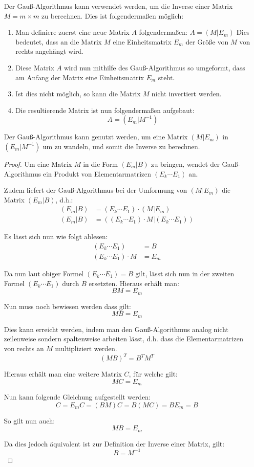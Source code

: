 Der Gauß-Algorithmus kann verwendet werden, um die Inverse einer Matrix $M = m \times m$ zu berechnen.
Dies ist folgendermaßen möglich:

\begin{enumerate}
\item Man definiere zuerst eine neue Matrix $A$ folgendermaßen:
$A = (M|E_m)$
Dies bedeutet, dass an die Matrix $M$ eine Einheitsmatrix $E_m$ der Größe von $M$ von rechts angehängt wird. 
\item Diese Matrix $A$ wird nun mithilfe des Gauß-Algorithmus so umgeformt, dass am Anfang der Matrix eine Einheitsmatrix $E_m$ steht.
\item Ist dies nicht möglich, so kann die Matrix $M$ nicht invertiert werden.
\item Die resultierende Matrix ist nun folgendermaßen aufgebaut: \[ A = (E_m|M^{-1}) \]
\end{enumerate}

\begin{Them}
Der Gauß-Algorithmus kann genutzt werden, um eine Matrix $(M|E_m)$ in $(E_m|M^{-1})$ um zu wandeln, und somit die Inverse zu berechnen.
\end{Them}

\begin{proof}
Um eine Matrix $M$ in die Form $(E_m|B)$ zu bringen, wendet der Gauß-Algorithmus ein Produkt von Elementarmatrizen $(E_k \cdots E_1)$ an.

Zudem liefert der Gauß-Algorithmus bei der Umformung von $(M|E_m)$ die Matrix $(E_m|B)$, d.h.: 
\begin{align*}
  (E_m|B) &= (E_k \cdots E_1) \cdot (M|E_m)\\ 
  (E_m|B) &= ((E_k \cdots E_1) \cdot M | (E_k \cdots E_1))
\end{align*}

Es lässt sich nun wie folgt ablesen:
\begin{align*}
 (E_k \cdots E_1) &= B \\
(E_k \cdots E_1) \cdot M &= E_m
\end{align*}

Da nun laut obiger Formel $(E_k \cdots E_1) = B$ gilt, lässt sich nun in der zweiten Formel $(E_k \cdots E_1)$ durch $B$ ersetzten. Hieraus erhält man:
\[ B M = E_m \]

Nun muss noch bewiesen werden dass gilt: 
\[ M B = E_m \]

Dies kann erreicht werden, indem man den Gauß-Algorithmus analog nicht zeilenweise sondern spaltenweise arbeiten lässt, d.h. dass die Elementarmatrizen von rechts an $M$ multipliziert werden.
\[ (MB)^T = B^TM^T \]

Hieraus erhält man eine weitere Matrix $C$, für welche gilt:
\[ MC = E_m \]

Nun kann folgende Gleichung aufgestellt werden: 
\[ C = E_mC = (BM)C = B(MC) = BE_m = B \]

So gilt nun auch: 
\[ MB = E_m \]

Da dies jedoch äquivalent ist zur Definition der Inverse einer Matrix, gilt:
\[ B=M^{-1}\]



\end{proof}